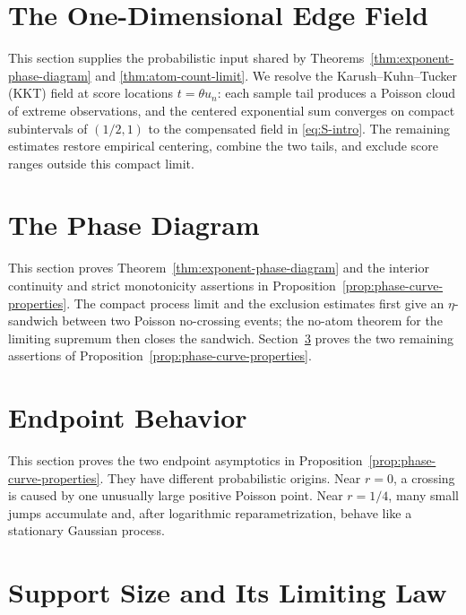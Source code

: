 \documentclass[11pt]{article}
\theoremstyle{definition}
\numberwithin{equation}{section}
\begin{document}
\section{The One-Dimensional Edge Field}
\label{sec:one-dimensional-edge-field}

This section supplies the probabilistic input shared by
Theorems~\ref{thm:exponent-phase-diagram} and \ref{thm:atom-count-limit}. We
resolve the Karush--Kuhn--Tucker (KKT) field at score locations
\(t=\theta u_n\): each sample tail produces a Poisson cloud of extreme
observations, and the centered exponential sum converges on compact
subintervals of \((1/2,1)\) to the compensated field in
\eqref{eq:S-intro}. The remaining estimates restore empirical centering,
combine the two tails, and exclude score ranges outside this compact limit.



\section{The Phase Diagram}
\label{sec:phase-diagram}

This section proves Theorem~\ref{thm:exponent-phase-diagram} and the interior
continuity and strict monotonicity assertions in
Proposition~\ref{prop:phase-curve-properties}. The compact process limit and
the exclusion estimates first give an \(\eta\)-sandwich between two Poisson
no-crossing events; the no-atom theorem for the limiting supremum then closes
the sandwich. Section~\ref{sec:endpoints} proves the two remaining assertions
of Proposition~\ref{prop:phase-curve-properties}.



\section{Endpoint Behavior}
\label{sec:endpoints}

This section proves the two endpoint asymptotics in
Proposition~\ref{prop:phase-curve-properties}. They have different
probabilistic origins. Near \(r=0\), a crossing is caused by one unusually
large positive Poisson point. Near \(r=1/4\), many small jumps accumulate and,
after logarithmic reparametrization, behave like a stationary Gaussian
process.



\section{Support Size and Its Limiting Law}
\label{sec:support-tightness}
\end{document}
